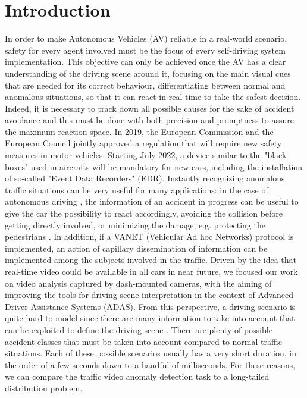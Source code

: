 \section{Introduction}

In order to make Autonomous Vehicles (AV) reliable in a real-world scenario, safety for every agent involved must be the focus of every self-driving system implementation.
This objective can only be achieved once the AV has a clear understanding of the driving scene around it, focusing on the main visual cues that are needed for its correct behaviour, differentiating between normal and anomalous situations, so that it can react in real-time to take the safest decision.
Indeed, it is necessary to track down all possible causes for the sake of accident avoidance and this must be done with both precision and promptness to assure the maximum reaction space.
In 2019, the European Commission and the European Council jointly approved a regulation that will require new safety measures in motor vehicles.
Starting July 2022, a device similar to the "black boxes" used in aircrafts will be mandatory for new cars, including the installation of so-called "Event Data Recorders" (EDR).
Instantly recognizing anomalous traffic situations can be very useful for many applications:
in the case of autonomous driving \cite{codevilla2019exploring}, the information of an accident in progress can be useful to give the car the possibility to react accordingly, avoiding the collision before getting directly involved, or minimizing the damage, e.g. protecting the pedestrians \cite{4298901}.
In addition, if a VANET (Vehicular Ad hoc Networks) protocol \cite{fatemidokht2021efficient} is implemented, an action of capillary dissemination of information can be implemented among the subjects involved in the traffic.
Driven by the idea that real-time video could be available in all cars in near future, we focused our work on video analysis captured by dash-mounted cameras, with the aiming of improving the tools for driving scene interpretation in the context of Advanced Driver Assistance Systems (ADAS).
From this perspective, a driving scenario is quite hard to model since there are many information to take into account that can be exploited to define the driving scene  .
There are plenty of possible accident classes that must be taken into account compared to normal traffic situations.
Each of these possible scenarios usually has a very short duration, in the order of a few seconds down to a handful of milliseconds.
For these reasons, we can compare the traffic video anomaly detection task to a long-tailed distribution problem.
